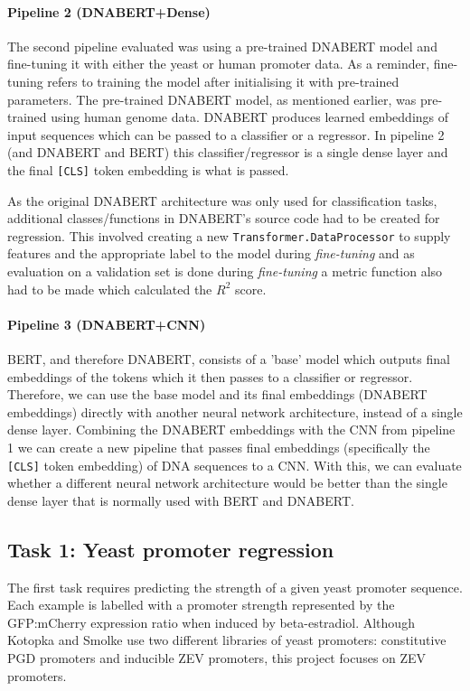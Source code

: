 \documentclass{article}
\begin{document}
\paragraph{Pipeline 2 (DNABERT+Dense)} The second pipeline evaluated was using a pre-trained DNABERT model and fine-tuning it with either the yeast or human promoter data. As a reminder, fine-tuning refers to training the model after initialising it with pre-trained parameters. The pre-trained DNABERT model, as mentioned earlier, was pre-trained using human genome data. DNABERT produces learned embeddings of input sequences which can be passed to a classifier or a regressor. In pipeline 2 (and DNABERT and BERT) this classifier/regressor is a single dense layer and the final \texttt{[CLS]} token embedding is what is passed.

As the original DNABERT architecture was only used for classification tasks, additional classes/functions in DNABERT's source code had to be created for regression. This involved creating a new \texttt{Transformer.DataProcessor} to supply features and the appropriate label to the model during \textit{fine-tuning} and as evaluation on a validation set is done during \textit{fine-tuning} a metric function also had to be made which calculated the $R^2$ score.

\paragraph{Pipeline 3 (DNABERT+CNN)} BERT, and therefore DNABERT, consists of a 'base' model which outputs final embeddings of the tokens which it then passes to a classifier or regressor. Therefore, we can use the base model and its final embeddings (DNABERT embeddings) directly with another neural network architecture, instead of a single dense layer. Combining the DNABERT embeddings with the CNN from pipeline 1 we can create a new pipeline that passes final embeddings (specifically the \texttt{[CLS]} token embedding) of DNA sequences to a CNN. With this, we can evaluate whether a different neural network architecture would be better than the single dense layer that is normally used with BERT and DNABERT. 

\subsection{\textbf{Task 1:} Yeast promoter regression}

The first task requires predicting the strength of a given yeast promoter sequence. Each example is labelled with a promoter strength represented by the GFP:mCherry expression ratio when induced by beta-estradiol. Although Kotopka and Smolke \cite{smolke2020promoter} use two different libraries of yeast promoters: constitutive PGD promoters and inducible ZEV promoters, this project focuses on ZEV promoters.
\end{document}
